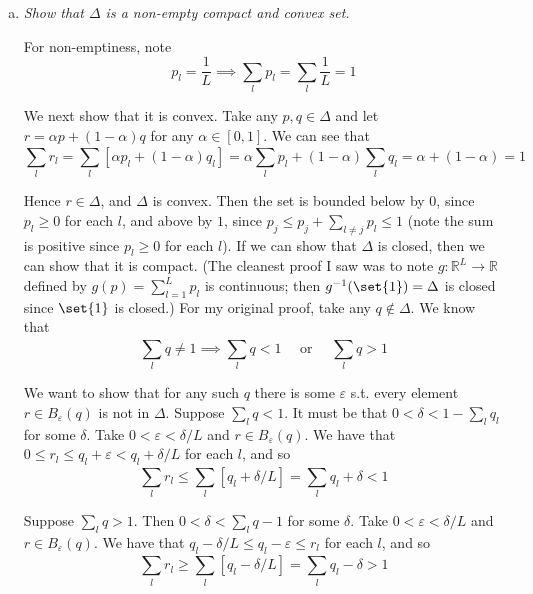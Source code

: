 \documentclass{article}
\begin{document}
\begin{enumerate}[1.]
    \begin{enumerate}[a)]
      \item \textit{Show that $\Delta$ is a non-empty compact and convex set.}

        \solution For non-emptiness, note
        \[
          p_l = \dfrac{1}{L}
          \implies
          \sum_l p_l = \sum^{}_{l} \dfrac{1}{L} = 1
        \]

        We next show that it is convex. Take any $p, q \in \Delta$ and let $r = \alpha p + (1 - \alpha) q$ for any $\alpha \in [0, 1]$. We can see that
        \[
          \sum^{}_{l} r_l
          = \sum^{}_{l} \left[\alpha p_l + (1 - \alpha) q_l\right]
          = \alpha \sum^{}_{l} p_l + (1 - \alpha) \sum^{}_{l} q_l
          = \alpha + (1 - \alpha)
          = 1
        \]

        Hence $r \in \Delta$, and $\Delta$ is convex. Then the set is bounded below by $0$, since $p_l \ge 0$ for each $l$, and above by $1$, since $p_j \le p_j + \sum^{}_{l \ne j} p_l \le 1$ (note the sum is positive since $p_l \ge 0$ for each $l$). If we can show that $\Delta$ is closed, then we can show that it is compact. (The cleanest proof I saw was to note $g: \mathbb{R}^L \to \mathbb{R}$ defined by $g(p) = \sum^{L}_{l = 1} p_l$ is continuous; then $g^{-1}(\set{1}) = \Delta$ is closed since $\set{1}$ is closed.) For my original proof, take any $q \notin \Delta$. We know that
        \[
          \sum^{}_{l} q \ne 1
          \implies
          \sum^{}_{l} q < 1
          \quad
          \text{ or }
          \quad
          \sum^{}_{l} q > 1
        \]

        We want to show that for any such $q$ there is some $\varepsilon$ s.t. every element $r \in B_{\varepsilon}(q)$ is not in $\Delta$. Suppose $\sum^{}_{l} q < 1$.  It must be that $0 < \delta < 1 - \sum^{}_{l} q_l$ for some $\delta$. Take $0 < \varepsilon < \delta / L$ and $r \in B_{\varepsilon}(q)$. We have that $0 \le r_l \le q_l + \varepsilon < q_l + \delta / L$ for each $l$, and so
        \[
          \sum^{}_{l} r_l \le \sum^{}_{l}  \left[q_l + \delta / L\right] = \sum^{}_{l}  q_l + \delta < 1
        \]

        Suppose $\sum^{}_{l} q > 1$. Then $0 < \delta < \sum^{}_{l} q - 1$ for some $\delta$. Take $0 < \varepsilon < \delta / L$ and $r \in B_{\varepsilon}(q)$. We have that $q_l - \delta / L \le q_l - \varepsilon \le r_l$ for each $l$, and so
        \[
          \sum^{}_{l} r_l \ge \sum^{}_{l}  \left[q_l - \delta / L\right] = \sum^{}_{l} q_l - \delta > 1
        \]


\end{enumerate}
\end{enumerate}
\end{document}
